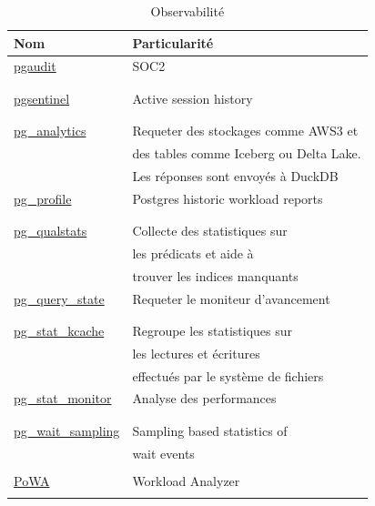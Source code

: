 \documentclass[a4paper,12pt]{article}
\begin{document}
\begin{multicols*}{2}
\begin{table}[H]
\caption{Observabilité}
\centering
\begin{tabular}{ll}
Nom & Particularité\\
\hline
\href{https://github.com/pgaudit/pgaudit}{pgaudit} & SOC2\\
 & \\
 & \\
\href{https://github.com/pgsentinel/pgsentinel}{pgsentinel} & Active session history\\
 & \\
 & \\
\href{https://github.com/paradedb/pg\_analytics}{pg\_analytics} & Requeter des stockages comme AWS3 et\\
 & des tables comme Iceberg ou Delta Lake.\\
 & Les réponses sont envoyés à DuckDB\\
\href{https://github.com/zubkov-andrei/pg\_profile}{pg\_profile} & Postgres historic workload reports\\
 & \\
 & \\
\href{https://github.com/powa-team/pg\_qualstats/}{pg\_qualstats} & Collecte des statistiques sur\\
 & les prédicats et aide à\\
 & trouver les indices manquants\\
\href{https://github.com/postgrespro/pg\_query\_state}{pg\_query\_state} & Requeter le moniteur d'avancement\\
 & \\
 & \\
\href{https://github.com/powa-team/pg\_stat\_kcache/}{pg\_stat\_kcache} & Regroupe les statistiques sur\\
 & les lectures et écritures\\
 & effectués par le système de fichiers\\
\href{https://github.com/percona/pg\_stat\_monitor}{pg\_stat\_monitor} & Analyse des performances\\
 & \\
 & \\
\href{https://github.com/postgrespro/pg\_wait\_sampling}{pg\_wait\_sampling} & Sampling based statistics of\\
 & wait events\\
 & \\
\href{https://github.com/powa-team/powa}{PoWA} & Workload Analyzer\\
 & \\

\end{tabular}
\end{table}
\end{multicols*}
\end{document}

